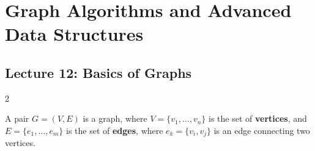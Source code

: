 \pagebreak
\section{Graph Algorithms and Advanced Data Structures}

\subsection{Lecture 12: Basics of Graphs}

\begin{multicols}{2}
\begin{definition}[Graph]
A pair $G = (V, E)$ is a graph, where $V = \{v_1, \ldots, v_n\}$ is the set of \textbf{vertices}, and $E = \{e_1, \ldots, e_m\}$ is the set of \textbf{edges}, where $e_k = \{v_i, v_j\}$ is an edge connecting two vertices. 


\end{definition}
\end{multicols}
